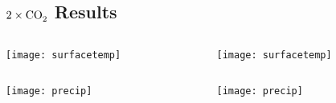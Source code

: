 \documentclass{beamer}
\begin{document}

\subsection{$2\times\ce{CO2}$ Results}
\begin{frame}
\begin{columns}
\begin{column}{4cm}\centering
	\texttt{[image: surfacetemp]}
\end{column}
\begin{column}{4cm}\centering
	\texttt{[image: surfacetemp]}
\end{column}
\end{columns}
\begin{columns}
\begin{column}{4cm}\centering
	\texttt{[image: precip]}
\end{column}
\begin{column}{4cm}\centering
	\texttt{[image: precip]}
\end{column}
\end{columns}
\end{frame}
\end{document}

